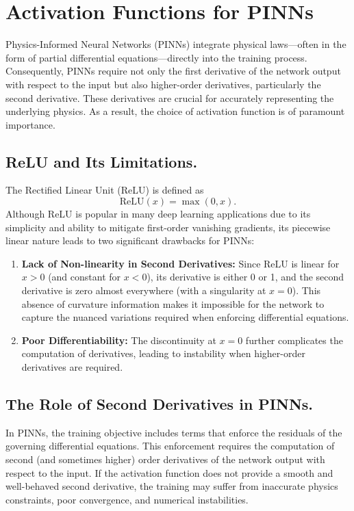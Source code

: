 \section{Activation Functions for PINNs}

Physics-Informed Neural Networks (PINNs) integrate physical laws—often in the form of partial differential equations—directly into the training process. Consequently, PINNs require not only the first derivative of the network output with respect to the input but also higher-order derivatives, particularly the second derivative. These derivatives are crucial for accurately representing the underlying physics. As a result, the choice of activation function is of paramount importance.

\subsection{ReLU and Its Limitations.}
The Rectified Linear Unit (ReLU) is defined as
\[
\text{ReLU}(x) = \max(0, x).
\]
Although ReLU is popular in many deep learning applications due to its simplicity and ability to mitigate first-order vanishing gradients, its piecewise linear nature leads to two significant drawbacks for PINNs:
\begin{enumerate}
    \item \textbf{Lack of Non-linearity in Second Derivatives:} Since ReLU is linear for \(x>0\) (and constant for \(x<0\)), its derivative is either 0 or 1, and the second derivative is zero almost everywhere (with a singularity at \(x=0\)). This absence of curvature information makes it impossible for the network to capture the nuanced variations required when enforcing differential equations.
    \item \textbf{Poor Differentiability:} The discontinuity at \(x=0\) further complicates the computation of derivatives, leading to instability when higher-order derivatives are required.
\end{enumerate}

\subsection{The Role of Second Derivatives in PINNs.}
In PINNs, the training objective includes terms that enforce the residuals of the governing differential equations. This enforcement requires the computation of second (and sometimes higher) order derivatives of the network output with respect to the input. If the activation function does not provide a smooth and well-behaved second derivative, the training may suffer from inaccurate physics constraints, poor convergence, and numerical instabilities.

